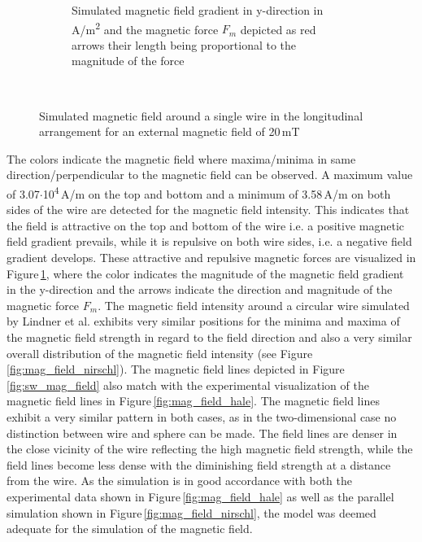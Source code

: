 \begin{figure}[H]
\begin{subfigure}{0.49\textwidth}
                \caption{Simulated magnetic field gradient in y-direction in A/m\textsuperscript{2} and the magnetic force $F_{m}$ depicted as red arrows their length being proportional to the magnitude of the force}\label{fig:mag_force_sw}
        \end{subfigure}
        \\
        \caption[Simulated magnetic field around a single wire]{Simulated magnetic field around a single wire in the longitudinal arrangement for an external magnetic field of 20\,mT}
        \label{fig:sw_fm_mag_field}
  \end{figure}

% 

The colors indicate the magnetic field where maxima/minima in same direction/perpendicular to the magnetic field can be observed. A maximum value of 3.07$\cdotp$10\textsuperscript{4}\,A/m on the top and bottom and a minimum of 3.58\,A/m on both sides of the wire are detected for the magnetic field intensity. This indicates that the field is attractive on the top and bottom of the wire i.e. a positive magnetic field gradient prevails, while it is repulsive on both wire sides, i.e. a negative field gradient develops. These attractive and repulsive magnetic forces are visualized in Figure\,\ref{fig:mag_force_sw}, where the color indicates the magnitude of the magnetic field gradient in the y-direction and the arrows indicate the direction and magnitude of the magnetic force $F_{m}$. The magnetic field intensity around a circular wire simulated by Lindner et al. \cite{lindner2013simulation} exhibits very similar positions for the minima and maxima of the magnetic field strength in regard to the field direction and also a very similar overall distribution of the magnetic field intensity (see Figure\,\ref{fig:mag_field_nirschl}). The magnetic field lines depicted in Figure\,\ref{fig:sw_mag_field} also match with the experimental visualization of the magnetic field lines in Figure\,\ref{fig:mag_field_hale}. The magnetic field lines exhibit a very similar pattern in both cases, as in the two-dimensional case no distinction between wire and sphere can be made. The field lines are denser in the close vicinity of the wire reflecting the high magnetic field strength, while the field lines become less dense with the diminishing field strength at a distance from the wire. As the simulation is in good accordance with both the experimental data shown in Figure\,\ref{fig:mag_field_hale} as well as the parallel simulation shown in Figure\,\ref{fig:mag_field_nirschl}, the model was deemed adequate for the simulation of the magnetic field.  

